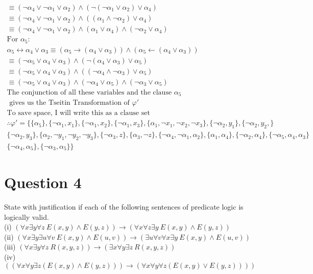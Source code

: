 \documentclass[12pt]{fphw}
\begin{document}
\begin{gather*}
  \equiv (\neg \alpha_4 \vee \neg \alpha_1 \vee \alpha_2) \wedge (\neg(\neg \alpha_1 \vee \alpha_2) \vee \alpha_4) \\
  \equiv (\neg \alpha_4 \vee \neg \alpha_1 \vee \alpha_2) \wedge ((\alpha_1 \wedge \neg \alpha_2) \vee \alpha_4) \\
  \equiv (\neg \alpha_4 \vee \neg \alpha_1 \vee \alpha_2) \wedge (\alpha_1 \vee \alpha_4) \wedge (\neg \alpha_2 \vee \alpha_4) \\
  \text{For } \alpha_5: \\
  \alpha_5 \leftrightarrow \alpha_4 \vee \alpha_3 \equiv (\alpha_5 \to (\alpha_4 \vee \alpha_3)) \wedge (\alpha_5 \leftarrow (\alpha_4 \vee \alpha_3)) \\
  \equiv (\neg \alpha_5 \vee \alpha_4 \vee \alpha_3) \wedge (\neg(\alpha_4 \vee \alpha_3) \vee \alpha_5) \\
  \equiv (\neg \alpha_5 \vee \alpha_4 \vee \alpha_3) \wedge ((\neg \alpha_4 \wedge \neg \alpha_3) \vee \alpha_5) \\
  \equiv (\neg \alpha_5 \vee \alpha_4 \vee \alpha_3) \wedge (\neg \alpha_4 \vee \alpha_5) \wedge (\neg \alpha_3 \vee \alpha_5) \\
  \text{The conjunction of all these variables and the clause } \alpha_5 \\
  \text{ gives us the Tseitin Transformation of } \varphi' \\
  \text{To save space, I will write this as a clause set} \\
  \therefore \varphi' = \{\{\alpha_5\}, \{\neg \alpha_1, x_1\}, \{\neg \alpha_1, x_2\}, \{\neg \alpha_1, x_3\}, \{\alpha_1, \neg x_1, \neg x_2, \neg x_3\}, \{\neg \alpha_2, y_1\}, \{\neg \alpha_2, y_2,\} \\ \{\neg \alpha_2, y_3\}, \{\alpha_2, \neg y_1, \neg y_2, \neg y_3\}, \{\neg \alpha_3, z\}, \{\alpha_3, \neg z\}, \{\neg \alpha_4, \neg \alpha_1, \alpha_2\}, \{\alpha_1, \alpha_4\}, \{\neg \alpha_2, \alpha_4\}, \{\neg \alpha_5, \alpha_4, \alpha_3\} \\ \{\neg \alpha_4, \alpha_5\}, \{\neg \alpha_3, \alpha_5\}\}
\end{gather*}

\section*{Question 4}

\begin{problem}
  State with justification if each of the following sentences of predicate logic is logically valid. \\
  (i) $(\forall x \exists y \forall z \ E(x,y) \wedge E(y,z)) \to (\forall x \forall z \exists y \ E(x,y) \wedge E(y,z))$ \\
  (ii) $(\forall x \exists y \exists u \forall v \ E(x,y) \wedge E(u,v)) \to (\exists u \forall v \forall x \exists y \ E(x,y) \wedge E(u,v))$ \\
  (iii) $(\forall x \exists y \forall z \ R(x,y,z)) \to (\exists x \forall y \exists z \ R(x,y,z))$ \\
  (iv) $((\forall x \forall y \exists z (E(x,y) \wedge E(y,z))) \to (\forall x \forall y \forall z (E(x,y) \vee E(y,z))))$
\end{problem}
\end{document}

